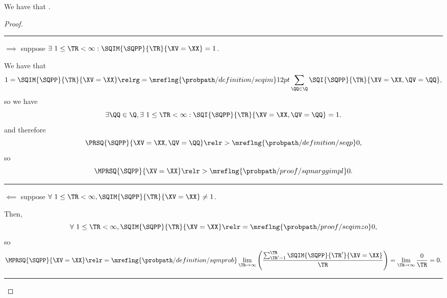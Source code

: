 \begin{proposition}
  We have that \sequimimplprop.%
\end{proposition}

\begin{proof}
  \hrule
  $\implies$ suppose $\exists\ 1 \le \TR < \infty : \SQIM{\SQPP}{\TR}{\XV = \XX} = 1$.

  We have that
  $$1 = \SQIM{\SQPP}{\TR}{\XV = \XX} 
  \relrg = {\mreflng{\probpath/definition/seqim}} 12pt
  \sum_{\QQ \in \Q}
  \SQI{\SQPP}{\TR}{\XV = \XX, \QV = \QQ},$$
  so we have
  $$\exists \QQ \in \Q, \exists\ 1 \le \TR < \infty : \SQI{\SQPP}{\TR}{\XV = \XX, \QV = \QQ} = 1.$$
  and therefore
  $$
  \PRSQ{\SQPP}{\XV = \XX, \QV = \QQ}
  \relr > {\mreflng{\probpath/definition/seqp}} 
  0,
  $$
  so
  $$
  \MPRSQ{\SQPP}{\XV = \XX}
  \relr > {\mreflng{\probpath/proof/sqmarggimpl}} 
  0.
  $$
  \hrule
  $\impliedby$ suppose $\forall \ 1 \le \TR < \infty, \SQIM{\SQPP}{\TR}{\XV = \XX} \ne 1$.

  Then, $$\forall \ 1 \le \TR < \infty, \SQIM{\SQPP}{\TR}{\XV = \XX} \relr = {\mreflng{\probpath/proof/seqimzo}} 0,$$
  so
  $$\MPRSQ{\SQPP}{\XV=\XX} 
  \relr = {\mreflng{\probpath/definition/sqmprob}} 
  \lim_{\TR \rightarrow \infty}\left(\frac{\sum_{\TR' = 1}^{\TR}\SQIM{\SQPP}{\TR'}{\XV = \XX}}{\TR}\right)
  =
  \lim_{\TR \rightarrow \infty}\frac{0}{\TR} = 0.
  $$
  \hrule
\end{proof}

